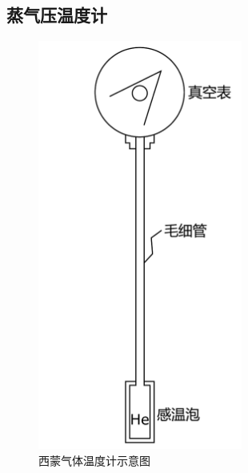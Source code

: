 \documentclass[a4paper]{article}
\begin{document}
\subsection{蒸气压温度计}
\begin{figure}[!h]
\begin{minipage}{0.48\textwidth}
\begin{center}
\includegraphics[width=0.6\textwidth]{fig/fig1.pdf}
\caption{西蒙气体温度计示意图}\label{fig1}
\end{center}
\end{minipage}
\begin{minipage}{0.48\textwidth}
\begin{center}

\end{center}
\end{minipage}
\end{figure}
\end{document}

